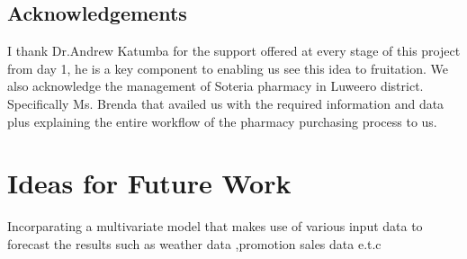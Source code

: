 \documentclass[12pt]{report}
\begin{document}
\subsection{Acknowledgements}
I thank Dr.Andrew Katumba for the support offered at every stage of this project from day 1, he is a key component to enabling us see this idea to fruitation. We also acknowledge the management of Soteria pharmacy in Luweero district. Specifically Ms. Brenda that availed us with the required information and data plus explaining the entire workflow of the pharmacy purchasing process to us.\\

\section{Ideas for Future Work}
Incorparating a multivariate model that makes use of various input data to forecast the results such as weather data ,promotion sales data e.t.c














%

\medskip
%
%
%
\end{document}
